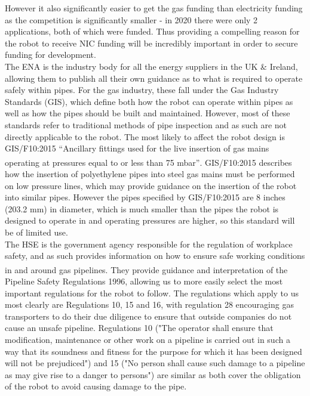\documentclass[11pt]{article}		%
\newcommand{\supercite}[1]{\textsuperscript{\cite{#1}}}		%
\begin{document}
			However it also significantly easier to get the gas funding than electricity funding as the competition is significantly smaller - in 2020 there were only 2 applications, both of which were funded.
			Thus providing a compelling reason for the robot to receive NIC funding will be incredibly important in order to secure funding for development.
			\\
			The ENA is the industry body for all the energy suppliers in the UK \& Ireland, allowing them to publish all their own guidance as to what is required to operate safely within pipes.
			For the gas industry, these fall under the Gas Industry Standards (GIS), which define both how the robot can operate within pipes as well as how the pipes should be built and maintained.
			However, most of these standards refer to traditional methods of pipe inspection and as such are not directly applicable to the robot.
			The most likely to affect the robot design is GIS/F10:2015 “Ancillary fittings used for the live insertion of gas mains operating at pressures equal to or less than 75 mbar”\supercite{energy2015gas}.
			GIS/F10:2015 describes how the insertion of polyethylene pipes into steel gas mains must be performed on low pressure lines, which may provide guidance on the insertion of the robot into similar pipes.
			However the pipes specified by 	GIS/F10:2015 are 8 inches (203.2 mm) in diameter, which is much smaller than the pipes the robot is designed to operate in and operating pressures are higher, so this standard will be of limited use.
			\\
			The HSE is the government agency responsible for the regulation of workplace safety, and as such provides information on how to ensure safe working conditions in and around gas pipelines.
			They provide guidance and interpretation\supercite{books1996guide} of the Pipeline Safety Regulations 1996, allowing us to more easily select the most important regulations for the robot to follow.
			The regulations which apply to us most clearly are Regulations 10, 15 and 16, with regulation 28 encouraging gas transporters to do their due diligence to ensure that outside companies do not cause an unsafe pipeline.
			Regulations 10 ("The operator shall ensure that modification, maintenance or other work on a pipeline is carried out in such a way that its soundness and fitness for the purpose for which it has been designed will not be prejudiced") and 15 ("No person shall cause such damage to a pipeline as may give rise to a danger to persons") are similar as both cover the obligation of the robot to avoid causing damage to the pipe.
\end{document}
